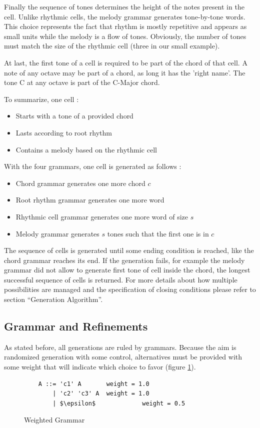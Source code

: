 \documentclass[twocolumn, 11pt]{article}
\begin{document}
Finally the sequence of tones determines the height of the notes present in the cell. Unlike rhythmic cells, the melody grammar generates tone-by-tone words.
This choice represents the fact that rhythm is mostly repetitive and appears as small units while the melody is a flow of tones.
Obviously, the number of tones must match the size of the rhythmic cell (three in our small example).

At last, the first tone of a cell is required to be part of the chord of that cell. A note of any octave may be part of a chord, as long it has the 'right name'. The tone C at any octave is part of the C-Major chord.

To summarize, one cell :
\begin{itemize}
\item Starts with a tone of a provided chord
\item Lasts according to root rhythm
\item Contains a melody based on the rhythmic cell
\end{itemize}

With the four grammars, one cell is generated as follows :
\begin{itemize}
\item Chord grammar generates one more chord $c$
\item Root rhythm grammar generates one more word
\item Rhythmic cell grammar generates one more word of size $s$
\item Melody grammar generates $s$ tones such that the first one is in $c$
\end{itemize}

The sequence of cells is generated until some ending condition is reached, like the chord grammar reaches its end.
If the generation fails, for example the melody grammar did not allow to generate first tone of cell inside the chord, the longest successful sequence of cells is returned.
For more details about how multiple possibilities are managed and the specification of closing conditions please refer to section ``Generation Algorithm''.

\subsection{Grammar and Refinements}

As stated before, all generations are ruled by grammars. Because the aim is randomized generation with some control, alternatives must be provided with some weight that will indicate which choice to favor (figure \ref{fig:dummyGrammar}).
\begin{figure}[h]
  \centering
  \begin{lstlisting}
    A ::= 'c1' A       weight = 1.0
        | 'c2' 'c3' A  weight = 1.0
        | $\epsilon$             weight = 0.5
  \end{lstlisting}
  \caption{Weighted Grammar}
  \label{fig:dummyGrammar}
\end{figure}
\end{document}
